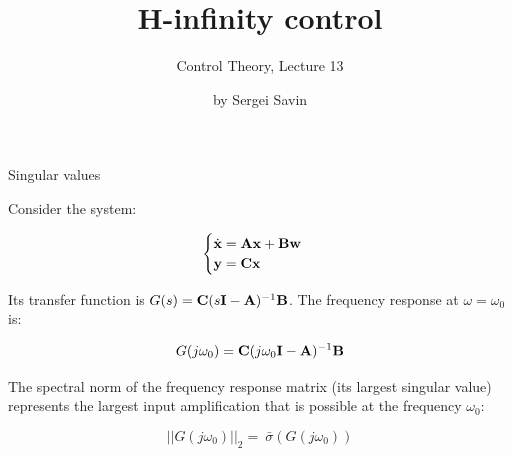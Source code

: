 \documentclass{beamer}
\title{H-infinity control}
\subtitle{Control Theory, Lecture 13}
\author{by Sergei Savin}
\date{\mydate}
\begin{document}
	\maketitle
	
	
	
	
	
	
	\begin{frame}{Singular values}
		\begin{flushleft}
			
			Consider the system:
			
			\begin{equation}
			\begin{cases}
				\dot{\mathbf{x}} = \mathbf{A}\mathbf{x}+\mathbf{B}\mathbf{w}
				\\
				\mathbf{y} = \mathbf{C}\mathbf{x}
			\end{cases}
			\end{equation}
			
			Its transfer function is $G(s) = \mathbf{C} (s\mathbf{I} - \mathbf{A})^{-1} \mathbf{B}$. The frequency response at $\omega = \omega_0$ is:
			
			\begin{equation}
				G(j\omega_0) = \mathbf{C} (j\omega_0\mathbf{I} - \mathbf{A})^{-1} \mathbf{B}
			\end{equation}
			
			The spectral norm of the frequency response matrix (its largest singular value) represents the largest input amplification that is possible at the frequency $ \omega_0$:
			
			\begin{equation}
				||G(j\omega_0)||_2 =\ \bar{\sigma} (G(j \omega_0))
			\end{equation}
			
			
		\end{flushleft}
	\end{frame}
	
	
		
\end{document}

